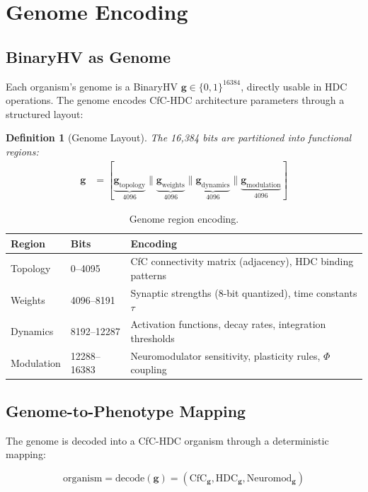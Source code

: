 \documentclass[11pt,a4paper]{article}
\newtheorem{definition}{Definition}
\begin{document}
\section{Genome Encoding}

\subsection{BinaryHV as Genome}

Each organism's genome is a BinaryHV $\mathbf{g} \in \{0, 1\}^{16384}$, directly usable in HDC operations. The genome encodes CfC-HDC architecture parameters through a structured layout:

\begin{definition}[Genome Layout]
The 16,384 bits are partitioned into functional regions:
\begin{align}
\mathbf{g} &= [\underbrace{\mathbf{g}_{\text{topology}}}_{4096} \| \underbrace{\mathbf{g}_{\text{weights}}}_{4096} \| \underbrace{\mathbf{g}_{\text{dynamics}}}_{4096} \| \underbrace{\mathbf{g}_{\text{modulation}}}_{4096}]
\end{align}
\end{definition}

\begin{table}[h]
\centering
\caption{Genome region encoding.}
\label{tab:genome}
\begin{tabular}{@{}llp{7cm}@{}}
\toprule
Region & Bits & Encoding \\
\midrule
Topology & 0--4095 & CfC connectivity matrix (adjacency), HDC binding patterns \\
Weights & 4096--8191 & Synaptic strengths (8-bit quantized), time constants $\tau$ \\
Dynamics & 8192--12287 & Activation functions, decay rates, integration thresholds \\
Modulation & 12288--16383 & Neuromodulator sensitivity, plasticity rules, $\Phi$ coupling \\
\bottomrule
\end{tabular}
\end{table}

\subsection{Genome-to-Phenotype Mapping}

The genome is decoded into a CfC-HDC organism through a deterministic mapping:

\begin{equation}
\text{organism} = \text{decode}(\mathbf{g}) = (\text{CfC}_{\mathbf{g}}, \text{HDC}_{\mathbf{g}}, \text{Neuromod}_{\mathbf{g}})
\end{equation}
\end{document}
